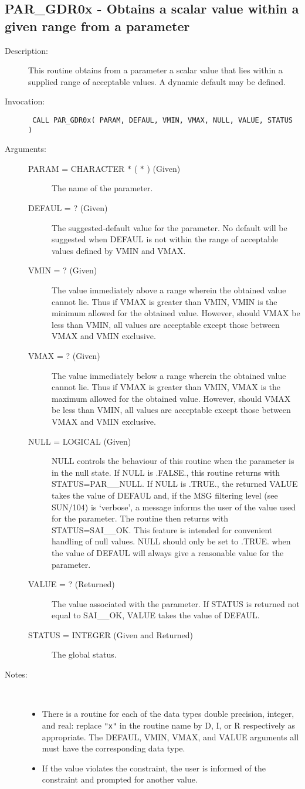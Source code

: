 \documentclass[twoside,11pt]{article}
\newcommand{\xref}[3]{#1}
\newcommand{\xlabel}[1]{}
\newcommand{\latex}[1]{#1}
\newlength{\sstbannerlength}
\newlength{\sstcaptionlength}
\newlength{\sstexampleslength}
\newlength{\sstexampleswidth}
\newcommand{\sstroutine}[3]{
   \goodbreak
   \rule{\textwidth}{0.5mm}
   \vspace{-7ex}
   \newline
   \settowidth{\sstbannerlength}{{\Large {\bf #1}}}
   \setlength{\sstcaptionlength}{\textwidth}
   \setlength{\sstexampleslength}{\textwidth}
   \addtolength{\sstbannerlength}{0.5em}
   \addtolength{\sstcaptionlength}{-2.0\sstbannerlength}
   \addtolength{\sstcaptionlength}{-5.0pt}
   \settowidth{\sstexampleswidth}{{\bf Examples:}}
   \addtolength{\sstexampleslength}{-\sstexampleswidth}
   \parbox[t]{\sstbannerlength}{\flushleft{\Large {\bf #1}}}
   \parbox[t]{\sstcaptionlength}{\center{\Large #2}}
   \parbox[t]{\sstbannerlength}{\flushright{\Large {\bf #1}}}
   \begin{description}
      #3
   \end{description}
}
\newcommand{\sstdescription}[1]{\item[Description:] #1}
\newcommand{\sstinvocation}[1]{\item[Invocation:]\hspace{0.4em}{\tt #1}}
\newcommand{\sstarguments}[1]{
   \item[Arguments:] \mbox{} \\
   \vspace{-3.5ex}
   \begin{description}
      #1
   \end{description}
}
\newcommand{\sstsubsection}[1]{ \item[{#1}] \mbox{} \\}
\newcommand{\sstnotes}[1]{\item[Notes:] \mbox{} \\[1.3ex] #1}
\newcommand{\sstitemlist}[1]{
  \mbox{} \\
  \vspace{-7ex}
  \begin{itemize}
     #1
  \end{itemize}
}
\newcommand{\sstitem}{\item}
\newcommand{\ssttt}{\tt}
\renewcommand{\sstroutine}[3]{
      \subsection{\xlabel{12}#1\xlabel{#1}-\label{#1}#2}
      \begin{description}
         #3
      \end{description}
   }
\renewcommand{\sstdescription}[1]{\item[Description:]
      \begin{description}
         #1
      \end{description}
   }
\renewcommand{\sstinvocation}[1]{\item[Invocation:]
      \begin{description}
         {\ssttt #1}
      \end{description}
   }
\renewcommand{\sstarguments}[1]{
      \item[Arguments:]
      \begin{description}
         #1
      \end{description}
   }
\renewcommand{\sstsubsection}[1]{\item[{#1}]}
\renewcommand{\sstnotes}[1]{\item[Notes:]
      \begin{description}
         #1
      \end{description}
   }
\newcommand{\sstitemlist}[1]{
      \begin{itemize}
         #1
      \end{itemize}
   }
\begin{document}
\sstroutine{
   PAR\_GDR0x
}{
   Obtains a scalar value within a given range from a parameter
}{
   \sstdescription{
      This routine obtains from a parameter a scalar value that lies
      within a supplied range of acceptable values.  A dynamic default
      may be defined.
   }
   \sstinvocation{
      CALL PAR\_GDR0x( PARAM, DEFAUL, VMIN, VMAX, NULL, VALUE, STATUS )
   }
   \sstarguments{
      \sstsubsection{
         PARAM = CHARACTER $*$ ( $*$ ) (Given)
      }{
         The name of the parameter.
      }
      \sstsubsection{
         DEFAUL = ? (Given)
      }{
         The suggested-default value for the parameter.  No default
         will be suggested when DEFAUL is not within the range of
         acceptable values defined by VMIN and VMAX.
      }
      \sstsubsection{
         VMIN = ? (Given)
      }{
         The value immediately above a range wherein the obtained
         value cannot lie.  Thus if VMAX is greater than VMIN, VMIN
         is the minimum allowed for the obtained value.  However,
         should VMAX be less than VMIN, all values are acceptable
         except those between VMAX and VMIN exclusive.
      }
      \sstsubsection{
         VMAX = ? (Given)
      }{
         The value immediately below a range wherein the obtained
         value cannot lie.  Thus if VMAX is greater than VMIN, VMAX
         is the maximum allowed for the obtained value.  However,
         should VMAX be less than VMIN, all values are acceptable
         except those between VMAX and VMIN exclusive.
      }
      \sstsubsection{
         NULL = LOGICAL (Given)
      }{
         NULL controls the behaviour of this routine when the parameter
         is in the null state.  If NULL is .FALSE., this routine
         returns with STATUS=PAR\_\_NULL.  If NULL is .TRUE., the
         returned VALUE takes the value of DEFAUL and, if the
\xref{MSG filtering level}{sun104}{conditional_message_reporting}
\latex{ (see SUN/104)} is `verbose',
         a message informs the user of the value used for
         the parameter. The routine then returns with STATUS=SAI\_\_OK. 
         This feature is intended for convenient handling of null values.
         NULL should only be set to .TRUE. when the value of DEFAUL will
         always give a reasonable value for the parameter.
      }
      \sstsubsection{
         VALUE  = ? (Returned)
      }{
         The value associated with the parameter.  If STATUS is returned
         not equal to SAI\_\_OK, VALUE takes the value of DEFAUL.
      }
      \sstsubsection{
         STATUS = INTEGER (Given and Returned)
      }{
         The global status.
      }
   }
   \sstnotes{
      \sstitemlist{

         \sstitem
         There is a routine for each of the data types double precision,
         integer, and real: replace {\tt "x"} in the routine name by
         D, I, or R respectively as appropriate.  The DEFAUL, VMIN,
         VMAX, and VALUE arguments all must have the corresponding
         data type.

         \sstitem
         If the value violates the constraint, the user is informed of
         the constraint and prompted for another value.
      }
   }
}
\end{document}
